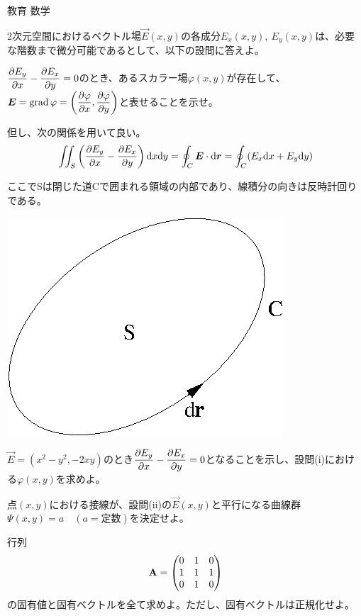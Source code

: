 \documentclass[fleqn]{jbook}
\begin{document}
\begin{question}{教育 数学}{}
\begin{subquestions}
\SubQuestion
2次元空間におけるベクトル場$\Vec{E}(x,y)$の各成分$E_x(x,y),\ E_y(x,y)$は、必要な階数まで微分可能であるとして、以下の設問に答えよ。

\begin{subsubquestions}
\SubSubQuestion
$\dfrac{\partial E_y}{\partial x}-\dfrac{\partial E_x}{\partial y}=0$のとき、あるスカラー場$\varphi(x,y)$が存在して、\\
$\bm{E} = {\rm grad\,}\varphi = \left( \dfrac{\partial \varphi}{\partial x},\dfrac{\partial \varphi}{\partial y} \right)$\quad と表せることを示せ。

但し、次の関係を用いて良い。
\[
\iint_S \left( \frac{\partial E_y}{\partial x}-\frac{\partial E_x}{\partial y} \right) {\rm d}x{\rm d}y = \oint_C \bm{E}\cdot{\rm d}\bm{r}
=\oint_C (E_x{\rm d}x+E_y{\rm d}y)
\]

ここでSは閉じた道Cで囲まれる領域の内部であり、線積分の向きは反時計回りである。
\begin{center}
\includegraphics[clip]{1999math-1.eps}
\end{center}

\SubSubQuestion
$\Vec{E}=(x^2-y^2,-2xy)$のとき$\dfrac{\partial E_y}{\partial x}-\dfrac{\partial E_x}{\partial y}=0$となることを示し、設問(i)における$\varphi(x,y)$を求めよ。

\SubSubQuestion
点$(x,y)$における接線が、設問(ii)の$\Vec{E}(x,y)$と平行になる曲線群$\varPsi(x,y)=a\quad (a=\text{定数})$を決定せよ。

\end{subsubquestions}

\SubQuestion
\begin{subsubquestions}
\SubSubQuestion
行列
\[
{\rm\bf A} = \begin{pmatrix}
	0 & 1 & 0\\
	1 & 1 & 1\\
	0 & 1 & 0
	\end{pmatrix}
\]
の固有値と固有ベクトルを全て求めよ。ただし、固有ベクトルは正規化せよ。


\end{subsubquestions}
\end{subquestions}
\end{question}
\end{document}
